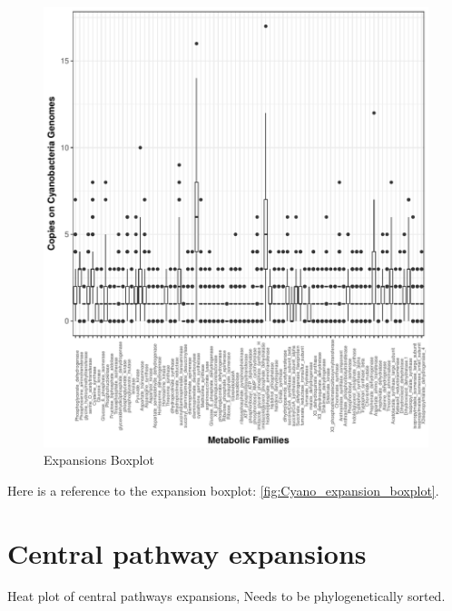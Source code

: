 \documentclass[12pt,twoside]{reedthesis}
\begin{document}
  \begin{figure}[h!tbp]
  \centering
  \includegraphics[angle = 0,scale = 1]{chapter5/expansion_plotCyanos.pdf}
  \caption[Expansions Boxplot]{\normalsize{Expansions Boxplot}}
  \label{fig:Cyano_expansion_boxplot}
  \end{figure}
  
  Here is a reference to the expansion boxplot:
  \autoref{fig:Cyano_expansion_boxplot}.\\
  \clearpage 
  
  \section{Central pathway expansions}\label{central-pathway-expansions-2}
  
  Heat plot of central pathways expansions, Needs to be phylogenetically
  sorted.
  
\end{document}

